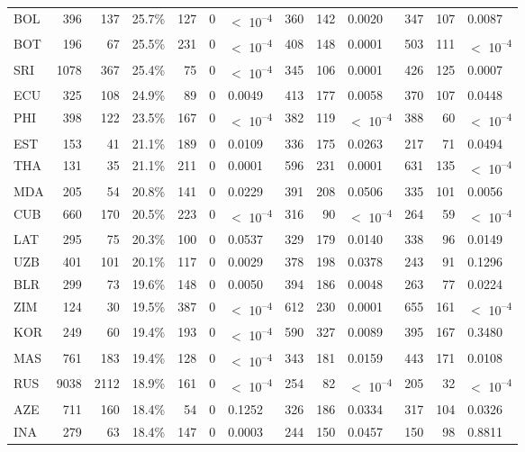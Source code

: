 \begin{tabular}[t]{lrrlrrlrrlrrl}
BOL & 396 & 137 & 25.7\% & 127 & 0 & $<$ 10\textsuperscript{--4} & 360 & 142 & 0.0020 & 347 & 107 & 0.0087\\
BOT & 196 & 67 & 25.5\% & 231 & 0 & $<$ 10\textsuperscript{--4} & 408 & 148 & 0.0001 & 503 & 111 & $<$ 10\textsuperscript{--4}\\
SRI & 1078 & 367 & 25.4\% & 75 & 0 & $<$ 10\textsuperscript{--4} & 345 & 106 & 0.0001 & 426 & 125 & 0.0007\\
ECU & 325 & 108 & 24.9\% & 89 & 0 & 0.0049 & 413 & 177 & 0.0058 & 370 & 107 & 0.0448\\
PHI & 398 & 122 & 23.5\% & 167 & 0 & $<$ 10\textsuperscript{--4} & 382 & 119 & $<$ 10\textsuperscript{--4} & 388 & 60 & $<$ 10\textsuperscript{--4}\\
EST & 153 & 41 & 21.1\% & 189 & 0 & 0.0109 & 336 & 175 & 0.0263 & 217 & 71 & 0.0494\\
THA & 131 & 35 & 21.1\% & 211 & 0 & 0.0001 & 596 & 231 & 0.0001 & 631 & 135 & $<$ 10\textsuperscript{--4}\\
MDA & 205 & 54 & 20.8\% & 141 & 0 & 0.0229 & 391 & 208 & 0.0506 & 335 & 101 & 0.0056\\
CUB & 660 & 170 & 20.5\% & 223 & 0 & $<$ 10\textsuperscript{--4} & 316 & 90 & $<$ 10\textsuperscript{--4} & 264 & 59 & $<$ 10\textsuperscript{--4}\\
LAT & 295 & 75 & 20.3\% & 100 & 0 & 0.0537 & 329 & 179 & 0.0140 & 338 & 96 & 0.0149\\
UZB & 401 & 101 & 20.1\% & 117 & 0 & 0.0029 & 378 & 198 & 0.0378 & 243 & 91 & 0.1296\\
BLR & 299 & 73 & 19.6\% & 148 & 0 & 0.0050 & 394 & 186 & 0.0048 & 263 & 77 & 0.0224\\
ZIM & 124 & 30 & 19.5\% & 387 & 0 & $<$ 10\textsuperscript{--4} & 612 & 230 & 0.0001 & 655 & 161 & $<$ 10\textsuperscript{--4}\\
KOR & 249 & 60 & 19.4\% & 193 & 0 & $<$ 10\textsuperscript{--4} & 590 & 327 & 0.0089 & 395 & 167 & 0.3480\\
MAS & 761 & 183 & 19.4\% & 128 & 0 & $<$ 10\textsuperscript{--4} & 343 & 181 & 0.0159 & 443 & 171 & 0.0108\\
RUS & 9038 & 2112 & 18.9\% & 161 & 0 & $<$ 10\textsuperscript{--4} & 254 & 82 & $<$ 10\textsuperscript{--4} & 205 & 32 & $<$ 10\textsuperscript{--4}\\
AZE & 711 & 160 & 18.4\% & 54 & 0 & 0.1252 & 326 & 186 & 0.0334 & 317 & 104 & 0.0326\\
INA & 279 & 63 & 18.4\% & 147 & 0 & 0.0003 & 244 & 150 & 0.0457 & 150 & 98 & 0.8811\\

\end{tabular}
